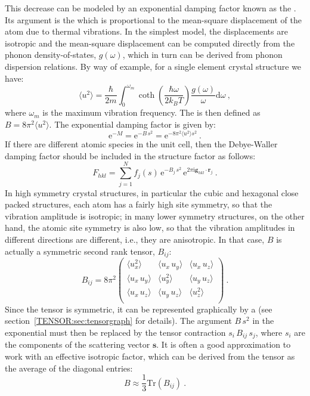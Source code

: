 This decrease can be modeled by an exponential damping factor known as the . Its argument is the  which is proportional to the mean-square displacement of the atom due to thermal vibrations. In the simplest model, the displacements are isotropic and the mean-square displacement can be computed directly from the phonon density-of-states,  $g(\omega)$, which in turn can be derived from phonon dispersion relations.  By way of example, for a single element crystal structure we have:
\[
	\langle u^2\rangle = \frac{\hbar}{2m}\int_0^{\omega_m}\coth\left(\frac{\hbar\omega}{2k_BT}\right)\frac{g(\omega)}{\omega}\mathrm{d}\omega\ ,
\]
where $\omega_m$ is the maximum vibration frequency.  The  is then defined as $B=8\pi^2\langle u^2\rangle$.  The exponential damping factor is given by:
\begin{equation}
	\mathrm{e}^{-M} = \mathrm{e}^{-B\,s^2}=\mathrm{e}^{-8\pi^2\langle u^2\rangle s^2}\ .\label{\chabbr:eq:DWF}
\end{equation}
If there are different atomic species in the unit cell, then the Debye-Waller damping factor should be included in the structure factor as follows:
\[
	F_{hkl} = \sum_{j=1}^{N} f_j(s)\,\mathrm{e}^{-B_j\,s^2}\,\mathrm{e}^{2\pi\mathrm{i}\mathbf{g}_{hkl}\cdot\mathbf{r}_j}\ .
\]
In high symmetry crystal structures, in particular the cubic and hexagonal close packed structures, each atom has a fairly high site symmetry, so that the vibration amplitude is isotropic; in many lower symmetry structures, on the other hand, the atomic site symmetry is also low, so that the vibration amplitudes in different directions are different, i.e., they are anisotropic. In that case, $B$ is actually a symmetric second rank tensor, $B_{ij}$:
\[
	B_{ij} = 8\pi^2\begin{pmatrix} \langle u_x^2\rangle & \langle u_x\,u_y\rangle &  \langle u_x\,u_z\rangle\\
	 \langle u_x\,u_y\rangle &  \langle u_y^2\rangle &  \langle u_y\,u_z\rangle\\
	 \langle u_x\,u_z\rangle &  \langle u_y\,u_z\rangle &  \langle u_z^2\rangle\\
	\end{pmatrix}\ .
\]
Since the tensor is symmetric, it can be represented graphically by a  (see section~\ref{TENSOR:sec:tensorgraph} for details).  The argument $B\,s^2$ in the exponential must then be replaced by the tensor contraction $s_i\,B_{ij}\,s_j$, where $s_i$ are the components of the scattering vector $\mathbf{s}$.  It is often a good approximation to work with an effective isotropic factor, which can be derived from the tensor as the average of the diagonal entries:
\[
	B \approx \frac{1}{3}\text{Tr}(B_{ij})\ .
\]



